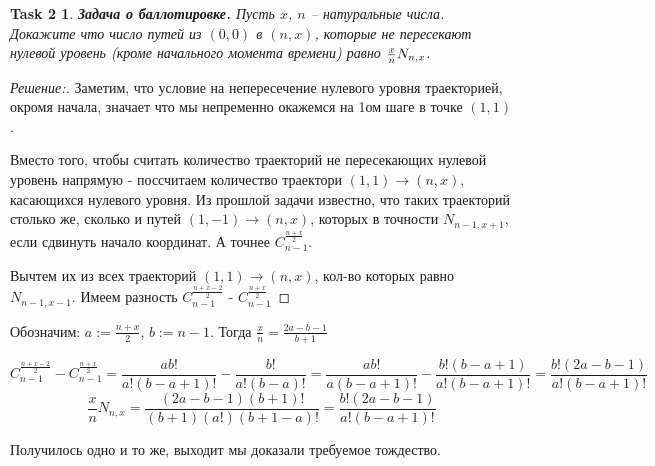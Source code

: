 \documentclass{article}
\newtheorem*{task2}{Task 2}
\begin{document}
     \vspace{\baselineskip}
    \begin{task2}
            \textbf{Задача о баллотировке.} Пусть $x$, $n$ -- натуральные числа. Докажите что число путей из $(0, 0)$ в $(n, x)$, которые не пересекают нулевой уровень (кроме начального момента времени) равно ${x\over n} N_{n, x}$.
        \end{task2}
    \begin{proof} [Решение:]
    Заметим, что условие на непересечение нулевого уровня траекторией, окромя начала, значает что мы непременно окажемся на 1ом шаге в точке $(1, 1)$. 
    
    Вместо того, чтобы считать количество траекторий не пересекающих нулевой уровень напрямую - поссчитаем количество траектори $(1, 1) \rightarrow (n, x)$, касающихся нулевого уровня.
    Из прошлой задачи известно, что таких траекторий столько же, сколько и путей $(1, -1) \rightarrow (n, x)$, которых в точности $N_{n-1, x+1}$, если сдвинуть начало координат. А точнее $C_{n-1}^{\frac{n+x}{2}}$.
    
    Вычтем их из всех траекторий $(1, 1) \rightarrow (n, x)$, кол-во которых равно $N_{n-1, x-1}$. Имеем разность $C_{n-1}^{\frac{n+x-2}{2}}$
     - $C_{n-1}^{\frac{n+x}{2}}$
    \end{proof}
    
    Обозначим: $a := \frac{n+x}{2}$, $b := n-1$. Тогда $\frac{x}{n} = \frac{2a - b - 1}{b + 1}$
    
\[
    C_{n-1}^{\frac{n+x-2}{2}} - C_{n-1}^{\frac{n+x}{2}} = \frac{a b!}{a!(b-a+1)!} - \frac{b!}{a! (b-a)!} = \frac{a b!}{a (b-a+1)!} - \frac{b! (b-a+1)}{a! (b-a+1)!} = \frac{b!(2a - b - 1)}{a! (b-a+1)!}
\]
\[
    \frac{x}{n} N_{n, x} = \frac{(2a - b - 1)(b+1)!}{(b+1)(a!)(b + 1 - a)!} = \frac{b!(2a - b - 1)}{a! (b-a+1)!}
    
\]

Получилось одно и то же, выходит мы доказали требуемое тождество.
    
\vspace{\baselineskip}
\end{document}
